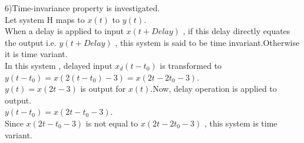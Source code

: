 \documentclass[10pt,a4paper, margin=1in]{article}
\begin{document}
\begin{enumerate}
\begin{enumerate}
 	6)Time-invariance property is investigated.\\
 	
	Let system H maps to $x(t)$ to $y(t)$.\\
 	When a delay is applied to input $x(t+Delay)$ , if this delay directly equates the output i.e.  $y(t+Delay)$ , this system is said to be time invariant.Otherwise it is time variant.\\ 
 	
 	In this system , delayed input $x_d(t-t_0)$ is transformed to $y(t-t_0) = x(2(t-t_0)-3) = x(2t-2t_0-3)$.\\

	$y(t) = x(2t-3)$ is output for $x(t)$.Now, delay operation is applied to output.\\
	
	$y(t-t_0) = x(2t-t_0-3)$.\\
	
	Since $x(2t-t_0-3)$ is not equal to $x(2t-2t_0-3)$ , this system is time variant.\\
 	  

\end{enumerate}
\end{enumerate}
\end{document}
